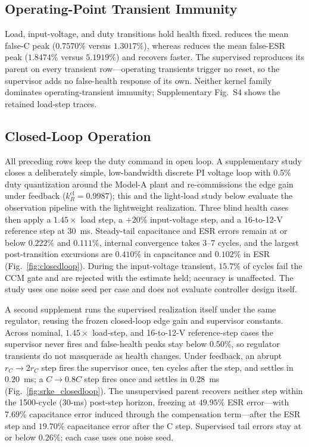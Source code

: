 \subsection{Operating-Point Transient Immunity}

Load, input-voltage, and duty transitions hold health fixed. \TSKF{} reduces the mean false-C peak ($0.7570\%$ versus $1.3017\%$), whereas \TSRLS{} reduces the mean false-ESR peak ($1.8474\%$ versus $5.1919\%$) and recovers faster. The supervised \TSSRKE{} reproduces its parent on every transient row---operating transients trigger no reset, so the supervisor adds no false-health response of its own. Neither kernel family dominates operating-transient immunity; Supplementary Fig.~S4 shows the retained load-step traces.

\subsection{Closed-Loop Operation}

All preceding rows keep the duty command in open loop. A supplementary study closes a deliberately simple, low-bandwidth discrete PI voltage loop with 0.5\% duty quantization around the Model-A plant and re-commissions the edge gain under feedback ($k_R^{\mathrm{cl}}=0.9987$); this and the light-load study below evaluate the observation pipeline with the lightweight \TSRLS{} realization. Three blind health cases then apply a $1.45\times$ load step, a $+20\%$ input-voltage step, and a 16-to-12-V reference step at 30~ms. Steady-tail capacitance and ESR errors remain at or below $0.222\%$ and $0.111\%$, internal convergence takes 3--7 cycles, and the largest post-transition excursions are $0.410\%$ in capacitance and $0.102\%$ in ESR (Fig.~\ref{fig:closedloop}). During the input-voltage transient, $15.7\%$ of cycles fail the CCM gate and are rejected with the estimate held; accuracy is unaffected. The study uses one noise seed per case and does not evaluate controller design itself.

A second supplement runs the supervised realization itself under the same regulator, reusing the frozen closed-loop edge gain and supervisor constants. Across nominal, $1.45\times$ load-step, and 16-to-12-V reference-step cases the supervisor never fires and false-health peaks stay below $0.50\%$, so regulator transients do not masquerade as health changes. Under feedback, an abrupt $r_C\rightarrow2r_C$ step fires the supervisor once, ten cycles after the step, and settles in $0.20$~ms; a $C\rightarrow0.8C$ step fires once and settles in $0.28$~ms (Fig.~\ref{fig:srke_closedloop}). The unsupervised parent recovers neither step within the 1500-cycle (30-ms) post-step horizon, freezing at $49.95\%$ ESR error---with $7.69\%$ capacitance error induced through the compensation term---after the ESR step and $19.70\%$ capacitance error after the C step. Supervised tail errors stay at or below $0.26\%$; each case uses one noise seed.

